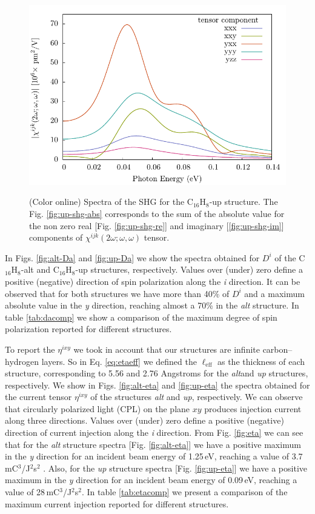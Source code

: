 \documentclass[aps,pra,11pt,tightenlines,showpacs,superscriptaddress,groupedaddress]{revtex4-1}
\newcommand{\lw}{0.55\linewidth}
\newcommand{\di}{$D^{i}$}
\newcommand{\ea}{$\eta^{ixy}$}
\newcommand{\altstc}{C$_{16}$H$_{8}$-alt}
\newcommand{\upstc}{C$_{16}$H$_{8}$-up}
\begin{document}
\begin{figure}
{            \includegraphics[width=\lw]{up/up_shg_final_abs_sm}}
    \caption{(Color online) Spectra of the SHG for the {\upstc} structure. The
    Fig. \ref{fig:up-shg-abs} corresponds to the sum of the absolute value for
    the non zero real [Fig. \ref{fig:up-shg-re}] and imaginary 
    [\ref{fig:up-shg-im}] components of $\chi^{ijk}(2\omega;\omega,\omega) $ 
    tensor.}\label{fig:shg-up}
\end{figure}


In Figs. \ref{fig:alt-Da} and \ref{fig:up-Da} we show the spectra obtained for
{\di} of the {\altstc} and {\upstc} structures, respectively. Values over
(under) zero define a positive (negative) direction of spin polarization along
the \emph{i} direction. It can be observed that for both structures we have
more than 40\% of {\di} and a maximum absolute value in the \emph{y} direction,
reaching almost a 70\% in the \emph{alt} structure. In table \ref{tab:dacomp}
we show a comparison of the maximum degree of spin polarization reported for
different structures.

To report the {\ea} we took in account that our structures are infinite carbon--
hydrogen layers. So in Eq. \ref{eq:etaeff} we defined the $\ell_{\text{eff}}$
as the thickness of each structure, corresponding to 5.56 and 2.76 Angstroms for 
the \emph{alt}and \emph{up} structures, respectively. We show in Figs. 
\ref{fig:alt-eta} and
\ref{fig:up-eta}  the spectra obtained for the current tensor {\ea} of the
structures \emph{alt} and \emph{up}, respectively. We can observe that
circularly polarized light (CPL) on the plane $xy$ produces injection current
along three directions. Values over (under) zero define a positive (negative)
direction of current injection along the \emph{i} direction. From Fig.
\ref{fig:eta} we can see that for the \emph{alt} structure spectra [Fig.
\ref{fig:alt-eta}] we have a positive maximum in the \emph{y} direction for an
incident beam energy of 1.25\,eV, reaching a value of
3.7\,mC$^{3}$/J$^{2}$s$^{2}$ . Also, for the \emph{up} structure spectra [Fig.
\ref{fig:up-eta}] we have a positive maximum in the \emph{y} direction for an
incident beam energy of 0.09\,eV, reaching a value of
28\,mC$^{3}$/J$^{2}$s$^{2}$. In table \ref{tab:etacomp} we present a comparison
of the maximum current injection reported for different structures.
\end{document}

